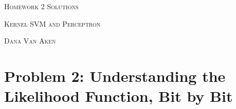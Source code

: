 \documentclass{article}
\begin{document}
\section*{}
\begin{center}
  \centerline{\textsc{\LARGE Homework 2{\if{} Solutions \else \fi}}}
  \vspace{0.5em}
  \centerline{\textsc{\Large Kernel SVM and Perceptron}}
  \vspace{1em}
  \textsc{\large Dana Van Aken} \\
\end{center}

\section*{Problem 2: Understanding the Likelihood Function, Bit by Bit}
\end{document}
